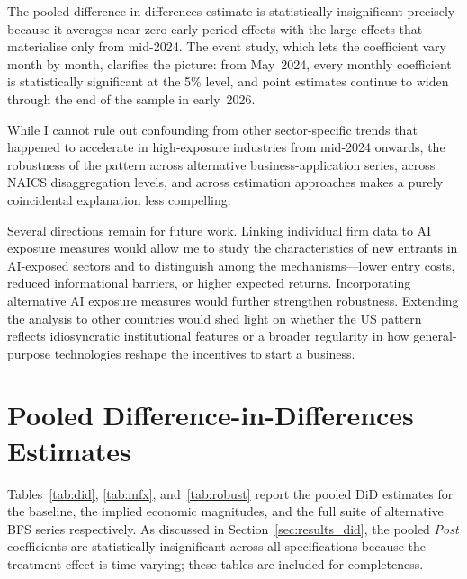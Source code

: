 \documentclass[12pt]{article}
\begin{document}
The pooled difference-in-differences estimate is statistically insignificant precisely because it averages near-zero early-period effects with the large effects that materialise only from mid-2024.
The event study, which lets the coefficient vary month by month, clarifies the picture: from May~2024, every monthly coefficient is statistically significant at the 5\% level, and point estimates continue to widen through the end of the sample in early~2026.

While I cannot rule out confounding from other sector-specific trends that happened to accelerate in high-exposure industries from mid-2024 onwards, the robustness of the pattern across alternative business-application series, across NAICS disaggregation levels, and across estimation approaches makes a purely coincidental explanation less compelling.

Several directions remain for future work.
Linking individual firm data to AI exposure measures would allow me to study the characteristics of new entrants in AI-exposed sectors and to distinguish among the mechanisms---lower entry costs, reduced informational barriers, or higher expected returns.
Incorporating alternative AI exposure measures \citep{eloundou2024gpts} would further strengthen robustness.
Extending the analysis to other countries would shed light on whether the US pattern reflects idiosyncratic institutional features or a broader regularity in how general-purpose technologies reshape the incentives to start a business.

\appendix





\section{Pooled Difference-in-Differences Estimates}
\label{app:did}

Tables~\ref{tab:did}, \ref{tab:mfx}, and~\ref{tab:robust} report the pooled DiD estimates for the baseline, the implied economic magnitudes, and the full suite of alternative BFS series respectively. As discussed in Section~\ref{sec:results_did}, the pooled \textit{Post} coefficients are statistically insignificant across all specifications because the treatment effect is time-varying; these tables are included for completeness.
\end{document}

